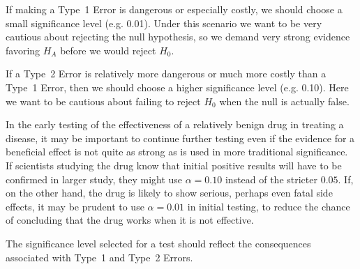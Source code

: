 \begin{spacing}{1.5}
If making a Type~1 Error is dangerous or especially costly, we should choose a small significance level (e.g. 0.01). Under this scenario we want to be very cautious about rejecting the null hypothesis, so we demand very strong evidence favoring $H_A$ before we would reject $H_0$.

If a Type~2 Error is relatively more dangerous or much more costly than a Type~1 Error, then we should choose a higher significance level (e.g. 0.10). Here we want to be cautious about failing to reject $H_0$ when the null is actually false.

In the early testing of the effectiveness of a relatively benign drug in treating a disease, it may be important to continue further testing even if the evidence for a beneficial effect is not quite as strong as is used in more traditional significance.  If scientists studying the drug know that initial positive results will have to be confirmed in larger study, they might use $\alpha = 0.10$ instead of the stricter $0.05$.  If, on the other hand, the drug is likely to show serious, perhaps even fatal side effects, it may be prudent to use $\alpha = 0.01$ in initial testing, to reduce the chance of concluding that the drug works when it is not effective.


\begin{tipBox}{
The significance level selected for a test should reflect the consequences associated with Type~1 and Type~2 Errors.}
\end{tipBox}





\end{spacing}
 


